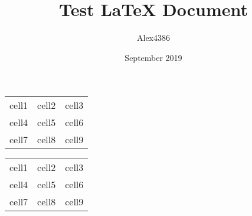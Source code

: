 \documentclass[12pt, letterpaper]{article}
\title{Test LaTeX Document}
\author{Alex4386}
\date{September 2019}
\begin{document}
\maketitle

\begin{center}
    \begin{tabular}{ c c c }
     cell1 & cell2 & cell3 \\ 
     cell4 & cell5 & cell6 \\  
     cell7 & cell8 & cell9    
    \end{tabular}
\end{center}

\begin{center}
    \begin{tabular}{ |c|c|c| } 
     \hline
     cell1 & cell2 & cell3 \\ 
     cell4 & cell5 & cell6 \\ 
     cell7 & cell8 & cell9 \\ 
     \hline
    \end{tabular}
\end{center}
\end{document}
